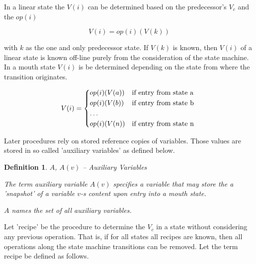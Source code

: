 \documentclass[12pt,a4paper]{scrartcl}
\theoremstyle{break}
\newtheorem{definition}{Definition}
\begin{document}
In a linear state the $V(i)$ can be determined based on the predecessor's
$V_c$ and the $op(i)$

\begin{equation} \label{eq:accumulation}
            V(i) = op(i)(V(k))                                         
\end{equation}

with $k$ as the one and only predecessor state. If $V(k)$ is known, then
$V(i)$ of a linear state is known off-line purely from the consideration of
the state machine.  In a mouth state $V(i)$ is be determined depending on the
state from where the transition originates.

\begin{equation} \label{eq:interference}
    V(i) = \begin{dcases*}
            op(i)(V(a)) & if entry from state a \\
            op(i)(V(b)) & if entry from state b \\
            \ldots \\
            op(i)(V(n)) & if entry from state n \\
            \end{dcases*}
\end{equation}

Later procedures rely on stored reference copies of variables. Those values
are stored in so called 'auxiliary variables' as defined below.

\begin{definition}
$A$, $A(v)$ -- Auxiliary Variables

The term auxiliary variable $A(v)$ specifies a variable that may store the
a 'snapshot' of a variable $v$-s content upon entry into a mouth state. 
   
$A$ names the set of all auxiliary variables.
\end{definition}

Let 'recipe' be the procedure to determine the $V_c$ in a state without
considering any previous operation. That is, if for all states all recipes are
known, then all operations along the state machine transitions can be removed.
Let the term recipe be defined as follows.
\end{document}
